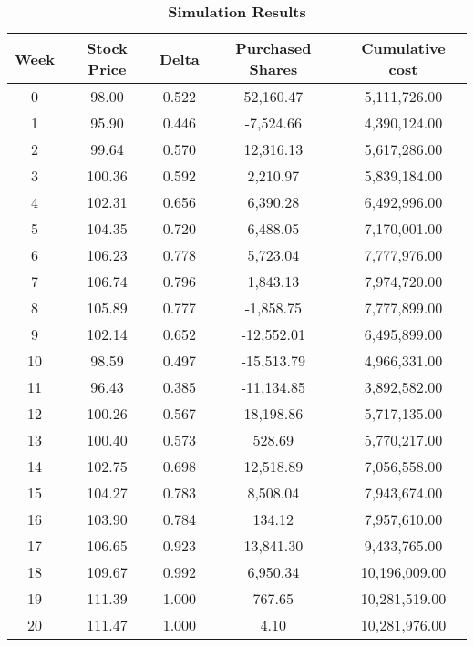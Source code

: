 \documentclass{article}
\begin{document}
\begin{table}[!htbp]
\centering
\caption{\bfseries  Simulation Results}
\begin{tabular}{c c c c c}
\hline
\textbf{Week} & \textbf{Stock Price} & \textbf{Delta}  & \textbf{Purchased Shares} & \textbf{Cumulative cost}\\
\hline
0	  & 98.00 	  & 0.522 	  & 52,160.47 	  & 5,111,726.00  \\
1	  & 95.90 	  & 0.446 	  & -7,524.66 	  & 4,390,124.00  \\
2	  & 99.64 	  & 0.570 	  & 12,316.13 	  & 5,617,286.00  \\
3	  & 100.36    & 0.592 	  & 2,210.97 	  & 5,839,184.00  \\
4	  & 102.31 	  & 0.656 	  & 6,390.28 	  & 6,492,996.00  \\
5	  & 104.35 	  & 0.720 	  & 6,488.05 	  & 7,170,001.00  \\
6	  & 106.23 	  & 0.778 	  & 5,723.04 	  & 7,777,976.00  \\
7	  & 106.74    &	0.796 	  & 1,843.13 	  & 7,974,720.00  \\
8	  & 105.89 	  & 0.777 	  & -1,858.75 	  & 7,777,899.00  \\
9	  & 102.14 	  & 0.652 	  & -12,552.01 	  & 6,495,899.00  \\
10	  & 98.59 	  & 0.497 	  & -15,513.79 	  & 4,966,331.00  \\
11	  & 96.43 	  & 0.385 	  & -11,134.85 	  & 3,892,582.00  \\
12	  & 100.26 	  & 0.567 	  & 18,198.86 	  & 5,717,135.00  \\
13	  & 100.40 	  & 0.573 	  & 528.69 	      & 5,770,217.00  \\
14	  & 102.75    &	0.698 	  & 12,518.89 	  & 7,056,558.00  \\
15	  & 104.27 	  & 0.783 	  & 8,508.04 	  & 7,943,674.00  \\
16	  & 103.90 	  & 0.784 	  & 134.12 	      & 7,957,610.00  \\
17	  & 106.65 	  & 0.923 	  & 13,841.30 	  & 9,433,765.00  \\
18	  & 109.67 	  & 0.992 	  & 6,950.34 	  & 10,196,009.00  \\
19	  & 111.39 	  & 1.000 	  & 767.65 	      & 10,281,519.00  \\
20	  & 111.47 	  & 1.000 	  & 4.10 	      & 10,281,976.00  \\
\hline
\end{tabular}
\end{table}
\end{document}
